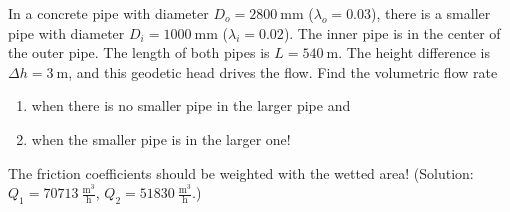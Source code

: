 
\vspace{1cm}

In a concrete pipe with diameter $D_o = 2800~\mathrm{mm}$ ($\lambda_o=0.03$), there is a smaller pipe with diameter $D_i=1000~\mathrm{mm}$ ($\lambda_i=0.02$). The inner pipe is in the center of the outer pipe. The length of both pipes is $L=540~\mathrm{m}$. The height difference is $\Delta h=3~\mathrm{m}$, and this geodetic head drives the flow. Find the volumetric flow rate
\begin{enumerate}
\item when there is no smaller pipe in the larger pipe and
\item when the smaller pipe is in the larger one!
\end{enumerate}
The friction coefficients should be weighted with the wetted area! (Solution: $Q_1=70713~\frac{\mathrm{m^3}}{\mathrm{h}}$, $Q_2=51830~\frac{\mathrm{m^3}}{\mathrm{h}}$.)
